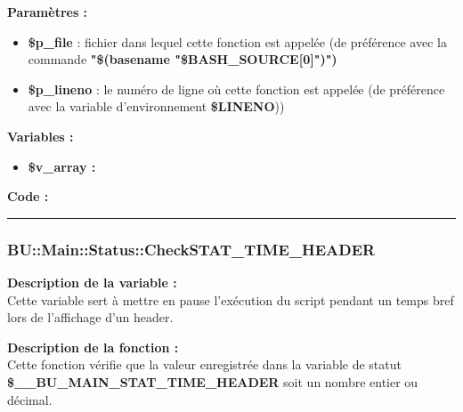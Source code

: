 \documentclass[a4paper,10pt]{article}
\begin{document}
\begin{justify}
    \textbf{Paramètres :}

    \begin{itemize}
        \item \color{orange}\textbf{\$p\_file}\color{white} : fichier dans lequel cette fonction est appelée (de préférence avec la commande \textbf{"\$(\color{gray}basename \color{white}"\color{orange}\$BASH\_SOURCE[0]\color{white}")")}\\

        \item \color{orange}\textbf{\$p\_lineno}\color{white} : le numéro de ligne où cette fonction est appelée (de préférence avec la variable d'environnement \textbf{\color{orange}\$LINENO}))
    \end{itemize}
\end{justify}

\begin{justify}
    \textbf{Variables :}

    \begin{itemize}
        \item \textbf{\color{orange}\$v\_array\color{white} :}
    \end{itemize}
\end{justify}

\begin{justify}
    \textbf{Code :}
\end{justify}



\color{blue}\par\noindent\rule{\textwidth}{0.4pt}\color{white}

\color{blue}
\subsubsection{\color{mauve}BU::Main::Status::CheckSTAT\_TIME\_HEADER}\color{white}

\begin{justify}
    \textbf{Description de la variable :}\\
    Cette variable sert à mettre en pause l'exécution du script pendant un temps bref lors de l'affichage d'un header.
\end{justify}

\begin{justify}
    \textbf{Description de la fonction :}\\
    Cette fonction vérifie que la valeur enregistrée dans la variable de statut \textbf{\color{orange}\$\_\_BU\_MAIN\_STAT\_TIME\_HEADER} soit un nombre entier ou décimal.
\end{justify}
\end{document}

